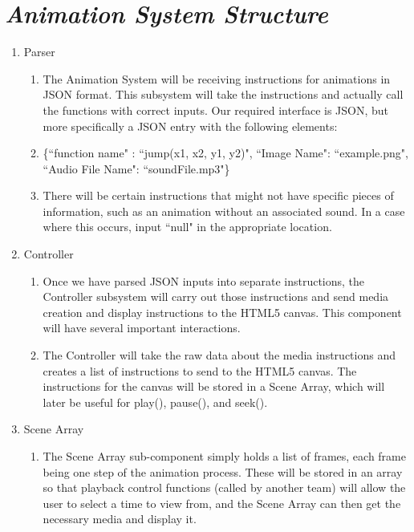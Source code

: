 \documentclass[12pt]{article}
\begin{document}
\section{\emph{Animation System Structure}}%
\begin{enumerate}
\item Parser
\begin{enumerate}
\item The Animation System will be receiving instructions for animations in JSON format. This subsystem will take the instructions and actually call the functions with correct inputs. Our required interface is JSON, but more specifically a JSON entry with the following elements:
\item \{``function name" : ``jump(x1, x2, y1, y2)", ``Image Name": ``example.png", ``Audio File Name": ``soundFile.mp3"\}
\item There will be certain instructions that might not have specific pieces of information, such as an animation without an associated sound. In a case where this occurs, input ``null" in the appropriate location.
\end{enumerate}

\item Controller
\begin{enumerate}
\item Once we have parsed JSON inputs into separate instructions, the Controller subsystem will carry out those instructions and send media creation and display instructions to the HTML5 canvas. This component will have several important interactions.
\item The Controller will take the raw data about the media instructions and creates a list of instructions to send to the HTML5 canvas. The instructions for the canvas will be stored in a Scene Array, which will later be useful for play(), pause(), and seek().
\end{enumerate}

\item Scene Array
\begin{enumerate}
\item The Scene Array sub-component simply holds a list of frames, each frame being one step of the animation process. These will be stored in an array so that playback control functions (called by another team) will allow the user to select a time to view from, and the Scene Array can then get the necessary media and display it. 
\end{enumerate}


\end{enumerate}
\end{document}
